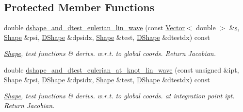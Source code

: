\subsection*{Protected Member Functions}
\begin{DoxyCompactItemize}
\item 
double \hyperlink{classoomph_1_1QLinearWaveElement_a97bfe7e067f0b8f3cf82b02ca1e7421e}{dshape\+\_\+and\+\_\+dtest\+\_\+eulerian\+\_\+lin\+\_\+wave} (const \hyperlink{classoomph_1_1Vector}{Vector}$<$ double $>$ \&\hyperlink{cfortran_8h_ab7123126e4885ef647dd9c6e3807a21c}{s}, \hyperlink{classoomph_1_1Shape}{Shape} \&psi, \hyperlink{classoomph_1_1DShape}{D\+Shape} \&dpsidx, \hyperlink{classoomph_1_1Shape}{Shape} \&test, \hyperlink{classoomph_1_1DShape}{D\+Shape} \&dtestdx) const
\begin{DoxyCompactList}\small\item\em \hyperlink{classoomph_1_1Shape}{Shape}, test functions \& derivs. w.\+r.\+t. to global coords. Return Jacobian. \end{DoxyCompactList}\item 
double \hyperlink{classoomph_1_1QLinearWaveElement_a96e8d0a3deace8fe691b5576607f1c0c}{dshape\+\_\+and\+\_\+dtest\+\_\+eulerian\+\_\+at\+\_\+knot\+\_\+lin\+\_\+wave} (const unsigned \&ipt, \hyperlink{classoomph_1_1Shape}{Shape} \&psi, \hyperlink{classoomph_1_1DShape}{D\+Shape} \&dpsidx, \hyperlink{classoomph_1_1Shape}{Shape} \&test, \hyperlink{classoomph_1_1DShape}{D\+Shape} \&dtestdx) const
\begin{DoxyCompactList}\small\item\em \hyperlink{classoomph_1_1Shape}{Shape}, test functions \& derivs. w.\+r.\+t. to global coords. at integration point ipt. Return Jacobian. \end{DoxyCompactList}\end{DoxyCompactItemize}
